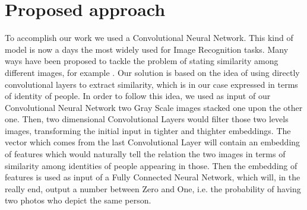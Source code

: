 \section{Proposed approach}
%

To accomplish our work we used a Convolutional Neural Network. This kind of model is now a days the most widely used for Image Recognition tasks. Many ways have been proposed to tackle the problem of stating similarity among different images, for example . Our solution is based on the idea of using directly convolutional layers to extract similarity, which is in our case expressed in terms of identity of people. In order to follow this idea, we used as input of our Convolutional Neural Network two Gray Scale images stacked one upon the other one. Then, two dimensional Convolutional Layers would filter those two levels images, transforming the initial input in tighter and thighter embeddings. The vector which comes from the last Convolutional Layer will contain an embedding of features which would naturally tell the relation the two images in terms of similarity among identities of people appearing in those. Then the embedding of features is used as input of a Fully Connected Neural Network, which will, in the really end, output a number between Zero and One, i.e. the probability of having two photos who depict the same person.

